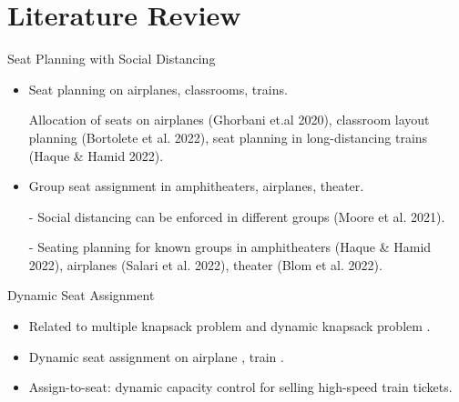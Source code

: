 
\section{Literature Review}
    \frame{\sectionpage}
    \begin{frame}{Seat Planning with Social Distancing}
      \begin{itemize}
        \item Seat planning on airplanes, classrooms, trains.

        Allocation of seats on airplanes (Ghorbani et.al 2020), classroom layout planning (Bortolete et al. 2022), seat planning in long-distancing trains (Haque \& Hamid 2022).
        \vspace*{0.5cm}
        \item Group seat assignment in amphitheaters, airplanes, theater.

        \item[-] Social distancing can be enforced in different groups (Moore et al. 2021).
        \vspace*{0.5cm}

        \item[-] Seating planning for known groups in amphitheaters (Haque \& Hamid 2022), airplanes (Salari et al. 2022), theater (Blom et al. 2022).
      \end{itemize}
      \end{frame}
      
      \begin{frame}{Dynamic Seat Assignment}
        \begin{itemize}
          \item Related to multiple knapsack problem \cite{pisinger1999exact} and dynamic knapsack problem \cite{kleywegt1998dynamic}.
          \vspace*{0.5cm}
          \item Dynamic seat assignment on airplane \cite{hamdouch2011schedule}, train \cite{berge1993demand, zhu2023assign}.
          \vspace*{0.5cm}
          \item Assign-to-seat: dynamic capacity control for selling high-speed train tickets. \cite{zhu2023assign}
        \end{itemize}
      \end{frame}